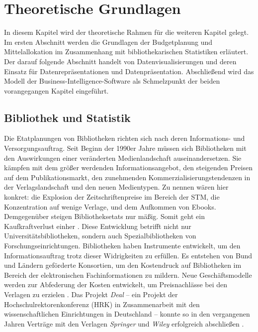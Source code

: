 \chapter{Theoretische Grundlagen}
\label{chap:two}
In diesem Kapitel wird der theoretische Rahmen für die weiteren Kapitel gelegt. Im
ersten Abschnitt werden die Grundlagen der Budgetplanung und Mittelallokation im Zusammenhang mit bibliothekarischen Statistiken erläutert. 
Der darauf folgende Abschnitt handelt von Datenvisualisierungen und deren Einsatz
für Datenrepräsentationen und Datenpräsentation. Abschließend wird das Modell der Business-Intelligence-Software als Schmelzpunkt der 
beiden vorangegangen Kapitel eingeführt.

\section{Bibliothek und Statistik}
\label{chap:two_one}
Die Etatplanungen von Bibliotheken richten sich nach deren Informations- und Versorgungsauftrag. 
Seit Beginn der 1990er Jahre müssen sich Bibliotheken mit den Auswirkungen einer veränderten Medienlandschaft auseinandersetzen.
Sie kämpfen mit dem größer werdenden Informationsangebot, den steigenden Preisen auf dem Publikationsmarkt, 
den zunehmenden Kommerzialisierungstendenzen in der Verlagslandschaft und den neuen Medientypen. 
Zu nennen wären hier konkret: die Explosion der Zeitschriftenpreise im Bereich der \acrfull{STM}, die Konzentration auf wenige Verlage, 
und dem Aufkommen von Ebooks. Demgegenüber steigen Bibliotheksetats nur mäßig. 
Somit geht ein Kaufkraftverlust einher \cite[Vgl.][164 ff.]{moravetz-kuhlmann_monika_erwerbungspolitik_2015}.
Diese Entwicklung betrifft nicht nur Universitätsbibliotheken, sondern auch Spezialbibliotheken von Forschungseinrichtungen.
Bibliotheken haben Instrumente entwickelt, um den Informationsauftrag trotz dieser Widrigkeiten zu erfüllen.
Es entstehen von Bund und Ländern geförderte Konsortien, um den Kostendruck auf Bibliotheken im Bereich der elektronischen
Fachinformationen zu mildern. Neue Geschäftsmodelle werden zur Abfederung der Kosten entwickelt, um Preisnachlässe bei den Verlagen zu erzielen
\cite[Vgl.][169 ff.]{moravetz-kuhlmann_monika_erwerbungspolitik_2015}. Das Projekt \textit{Deal} -- ein Projekt der Hochschulrektorenkonferenz (HRK) in Zusammenarbeit mit den
wissenschaftlichen Einrichtungen in Deutschland -- konnte so in den vergangenen Jahren Verträge mit den Verlagen \textit{Springer} und \textit{Wiley} erfolgreich abschließen \cite[Vgl.][]{projekt_deal_projekt_2020}.

